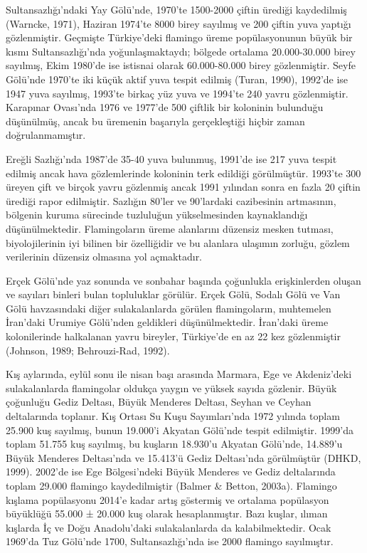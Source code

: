 \documentclass[
  a4paper,
  DIV=11,
  numbers=noendperiod]{scrreprt}
\begin{document}
Sultansazlığı'ndaki Yay Gölü'nde, 1970'te 1500-2000 çiftin ürediği
kaydedilmiş (Warncke, 1971), Haziran 1974'te 8000 birey sayılmış ve 200
çiftin yuva yaptığı gözlenmiştir. Geçmişte Türkiye'deki flamingo üreme
popülasyonunun büyük bir kısmı Sultansazlığı'nda yoğunlaşmaktaydı;
bölgede ortalama 20.000-30.000 birey sayılmış, Ekim 1980'de ise istisnai
olarak 60.000-80.000 birey gözlenmiştir. Seyfe Gölü'nde 1970'te iki
küçük aktif yuva tespit edilmiş (Turan, 1990), 1992'de ise 1947 yuva
sayılmış, 1993'te birkaç yüz yuva ve 1994'te 240 yavru gözlenmiştir.
Karapınar Ovası'nda 1976 ve 1977'de 500 çiftlik bir koloninin bulunduğu
düşünülmüş, ancak bu üremenin başarıyla gerçekleştiği hiçbir zaman
doğrulanmamıştır.

Ereğli Sazlığı'nda 1987'de 35-40 yuva bulunmuş, 1991'de ise 217 yuva
tespit edilmiş ancak hava gözlemlerinde koloninin terk edildiği
görülmüştür. 1993'te 300 üreyen çift ve birçok yavru gözlenmiş ancak
1991 yılından sonra en fazla 20 çiftin ürediği rapor edilmiştir.
Sazlığın 80'ler ve 90'lardaki cazibesinin artmasının, bölgenin kuruma
sürecinde tuzluluğun yükselmesinden kaynaklandığı düşünülmektedir.
Flamingoların üreme alanlarını düzensiz mesken tutması, biyolojilerinin
iyi bilinen bir özelliğidir ve bu alanlara ulaşımın zorluğu, gözlem
verilerinin düzensiz olmasına yol açmaktadır.

Erçek Gölü'nde yaz sonunda ve sonbahar başında çoğunlukla erişkinlerden
oluşan ve sayıları binleri bulan topluluklar görülür. Erçek Gölü, Sodalı
Gölü ve Van Gölü havzasındaki diğer sulakalanlarda görülen
flamingoların, muhtemelen İran'daki Urumiye Gölü'nden geldikleri
düşünülmektedir. İran'daki üreme kolonilerinde halkalanan yavru
bireyler, Türkiye'de en az 22 kez gözlenmiştir (Johnson, 1989;
Behrouzi-Rad, 1992).

Kış aylarında, eylül sonu ile nisan başı arasında Marmara, Ege ve
Akdeniz'deki sulakalanlarda flamingolar oldukça yaygın ve yüksek sayıda
gözlenir. Büyük çoğunluğu Gediz Deltası, Büyük Menderes Deltası, Seyhan
ve Ceyhan deltalarında toplanır. Kış Ortası Su Kuşu Sayımları'nda 1972
yılında toplam 25.900 kuş sayılmış, bunun 19.000'i Akyatan Gölü'nde
tespit edilmiştir. 1999'da toplam 51.755 kuş sayılmış, bu kuşların
18.930'u Akyatan Gölü'nde, 14.889'u Büyük Menderes Deltası'nda ve
15.413'ü Gediz Deltası'nda görülmüştür (DHKD, 1999). 2002'de ise Ege
Bölgesi'ndeki Büyük Menderes ve Gediz deltalarında toplam 29.000
flamingo kaydedilmiştir (Balmer \& Betton, 2003a). Flamingo kışlama
popülasyonu 2014'e kadar artış göstermiş ve ortalama popülasyon
büyüklüğü 55.000 ± 20.000 kuş olarak hesaplanmıştır. Bazı kuşlar, ılıman
kışlarda İç ve Doğu Anadolu'daki sulakalanlarda da kalabilmektedir. Ocak
1969'da Tuz Gölü'nde 1700, Sultansazlığı'nda ise 2000 flamingo
sayılmıştır.
\end{document}
